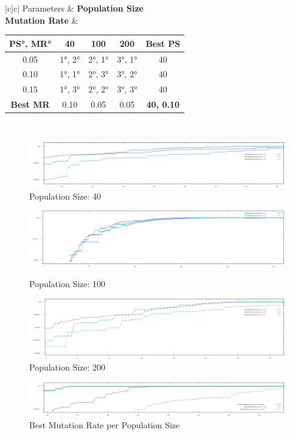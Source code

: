 \documentclass{article}
\begin{document}
\begin{table}[ht]
\centering
\begin{tabular}{|c|c|}
\hline
Parameters & \textbf{Population Size} \\
\hline
\textbf{Mutation Rate} & \begin{tabular}{c|ccc|c} \textbf{PS°, MR°} & 40 & 100 & 200 & \textbf{Best PS} \\
\hline 0.05 & 1°, 2° & 2°, 1° & 3°, 1° & 40 \\
0.10 & 1°, 1° & 2°, 3° & 3°, 2° & 40 \\ 
0.15 & 1°, 3° & 2°, 2° & 3°, 3° & 40 \\ 
\hline \textbf{Best MR} & 0.10 & 0.05 & 0.05 & \textbf{40, 0.10}\\
\end{tabular}\\
\hline
\end{tabular}
\end{table}
\begin{figure}[h]
  \centering
  \includegraphics[width=\textwidth]{PopulationSize40.png}
  \caption{Population Size: 40}
  \label{fig:Population Size: 40 individuals}
\end{figure}
\begin{figure}[h]
  \centering
  \includegraphics[width=\textwidth]{PopulationSize100.png}
  \caption{Population Size: 100}
  \label{fig:Population Size: 100 individuals}
  \includegraphics[width=\textwidth]{PopulationSize200.png}
  \caption{Population Size: 200}
  \label{fig:PopulationSize200}
\end{figure}
\begin{figure}[h]
  \centering
  \includegraphics[width=\textwidth]{BestMutationRatePerPopulationSize.png}
  \caption{Best Mutation Rate per Population Size}
  \label{fig:BestMutationRateperPopulationSize}
\end{figure}
\end{document}

